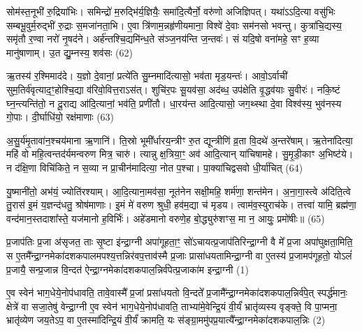 सोम॑स्त॒नूभी॑ रु॒द्रिया॑भिः। समिन्द्रो॑ म॒रुद्भि॑र्य॒ज्ञियैः॒ समा॑दि॒त्यैर्नो॒ वरु॑णो अजिज्ञिपत्। यथा॑\-ऽ\-ऽदि॒त्या वसु॑भिः सम्बभू॒वुर्म॒रुद्भी॑ रु॒द्राः स॒मजा॑नता॒भि। ए॒वा त्रि॑णाम॒न्नहृ॑णीयमाना॒ विश्वे॑ दे॒वाः सम॑नसो भवन्तु। कुत्रा॑चि॒द्यस्य॒ समृ॑तौ र॒ण्वा नरो॑ नृ॒षद॑ने। अर्\mbox{}ह॑न्तश्चि॒द्यमि॑न्ध॒ते स॑ञ्ज॒नय॑न्ति ज॒न्तवः॑। सं यदि॒षो वना॑महे॒ सꣳ ह॒व्या मानु॑षाणाम्। उ॒त द्यु॒म्नस्य॒ शव॑सः (62)

ऋ॒तस्य॑ र॒श्मिमाद॑दे। य॒ज्ञो दे॒वानां॒ प्रत्ये॑ति सु॒म्नमादि॑त्यासो॒ भव॑ता मृड॒यन्तः॑। आवो॒\-ऽर्वाची॑ सुम॒तिर्व॑वृत्या\-द॒ꣳ॒होश्चि॒द्या व॑रिवो॒वित्त॒रा\-ऽस॑त्। शुचि॑र॒पः सू॒यव॑सा॒ अद॑ब्ध॒ उप॑क्षेति वृ॒द्धव॑याः सु॒वीरः॑। नकि॒ष्टं घ्न॒न्त्यन्ति॑तो॒ न दू॒राद्य आ॑दि॒त्यानां॒ भव॑ति॒ प्रणी॑तौ। धा॒रय॑न्त आदि॒त्यासो॒ जग॒थ्स्था दे॒वा विश्व॑स्य॒ भुव॑नस्य गो॒पाः। दी॒र्घाधि॑यो॒ रक्ष॑माणाः (63)

अ॒सु॒र्य॑मृ॒तावा॑न॒श्चय॑माना ऋ॒णानि॑। ति॒स्रो भूमी᳚र्धारय॒न्त्रीꣳ रु॒त द्यून्त्रीणि॑ व्र॒ता वि॒दथे॑ अ॒न्तरे॑षाम्। ऋ॒तेना॑दित्या॒ महि॑ वो महि॒त्वन्तद॑र्यमन्वरुण मित्र॒ चारु॑। त्यान्नु क्ष॒त्रिया॒ꣳ॒ अव॑ आदि॒त्यान् या॑चिषामहे। सु॒मृ॒डी॒काꣳ अ॒भिष्ट॑ये। न द॑क्षि॒णा विचि॑किते॒ न स॒व्या न प्रा॒चीन॑मादित्या॒ नोत प॒श्चा। पा॒क्या॑चिद्वसवो धी॒र्या॑चित् (64)

यु॒ष्मानी॑तो॒ अभ॑यं॒ ज्योति॑रश्याम्। आ॒दि॒त्याना॒मव॑सा॒ नूत॑नेन सक्षी॒महि॒ शर्म॑णा॒ शन्त॑मेन। अ॒ना॒गा॒स्त्वे अ॑दिति॒त्वे तु॒रास॑ इ॒मं य॒ज्ञन्द॑धतु॒ श्रोष॑माणाः। इ॒मं मे॑ वरुण श्रुधी॒ हव॑म॒द्या च॑ मृडय। त्वाम॑व॒स्युराच॑के। तत्त्वा॑ यामि॒ ब्रह्म॑णा॒ वन्द॑मान॒स्तदाशा᳚स्ते॒ यज॑मानो ह॒विर्भिः॑। अहे॑डमानो वरुणे॒ह बो॒द्ध्युरु॑शꣳस॒ मा न॒ आयुः॒ प्रमो॑षीः॥ (65)


{\anuvakamend[{नामा॒ग्निः सꣳ शव॑सो॒ रक्ष॑माणा धी॒र्या॑चि॒देका॒न्नप॑ञ्चा॒शच्च॑॥11॥}]}

\setcounter{anuvakam}{0}
प्र॒जाप॑तिः प्र॒जा अ॑सृजत॒ ताः सृ॒ष्टा इ॑न्द्रा॒ग्नी अपा॑गूहता॒ꣳ॒ सो॑\-ऽचायत्प्र॒जाप॑तिरिन्द्रा॒ग्नी वै मे᳚ प्र॒जा अपा॑घुक्षता॒मिति॒ स ए॒तमै᳚न्द्रा॒ग्नमेका॑दशकपालमपश्य॒त्तन्निर॑वप॒त्ताव॑स्मै प्र॒जाः प्रासा॑धयतामिन्द्रा॒ग्नी वा ए॒तस्य॑ प्र॒जामप॑गूहतो॒ यो\-ऽलं॑ प्र॒जायै॒ सन्प्र॒जान्न वि॒न्दत॑ ऐन्द्रा॒ग्नमेका॑दशकपाल॒न्निर्व॑पेत्प्र॒जाका॑म इन्द्रा॒ग्नी (1)

ए॒व स्वेन॑ भाग॒धेये॒नोप॑धावति॒ तावे॒वास्मै᳚ प्र॒जां प्रसा॑धयतो वि॒न्दते᳚ प्र॒जामै᳚न्द्रा॒ग्नमेका॑दशकपाल॒न्निर्व॑पे॒त् स्पर्द्ध॑मानः॒ क्षेत्रे॑ वा सजा॒तेषु॑ वेन्द्रा॒ग्नी ए॒व स्वेन॑ भाग॒धेये॒नोप॑धावति॒ ताभ्या॑मे॒वेन्द्रि॒यं वी॒र्यं॑ भ्रातृ॑व्यस्य वृङ्क्ते॒ वि पा॒प्मना॒ भ्रातृ॑व्येण जय॒ते\-ऽप॒ वा ए॒तस्मा॑दिन्द्रि॒यं वी॒र्यं॑ क्रामति॒ यः स॑ङ्ग्रा॒ममु॑पप्र॒यात्यै᳚न्द्रा॒ग्नमेका॑दशकपाल॒न्निः (2)

